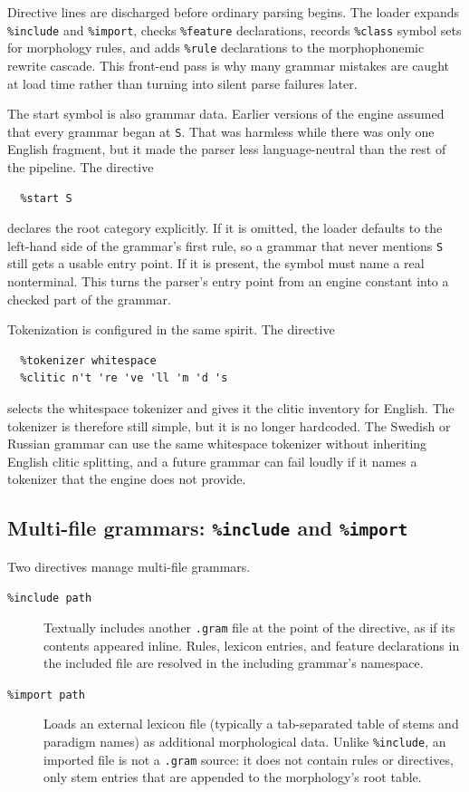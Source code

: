 \documentclass[11pt]{article}
\theoremstyle{definition}
\theoremstyle{plain}
\theoremstyle{remark}
\begin{document}
Directive lines are discharged before ordinary parsing begins. The loader expands
\texttt{\%include} and \texttt{\%import}, checks \texttt{\%feature}
declarations, records \texttt{\%class} symbol sets for morphology rules, and
adds \texttt{\%rule} declarations to the morphophonemic rewrite cascade. This
front-end pass is why many grammar mistakes are caught at load time rather than
turning into silent parse failures later.

The start symbol is also grammar data. Earlier versions of the engine assumed
that every grammar began at \texttt{S}. That was harmless while there was only
one English fragment, but it made the parser less language-neutral than the rest
of the pipeline. The directive

\begin{verbatim}
  %start S
\end{verbatim}

declares the root category explicitly. If it is omitted, the loader defaults to
the left-hand side of the grammar's first rule, so a grammar that never mentions
\texttt{S} still gets a usable entry point. If it is present, the symbol must
name a real nonterminal. This turns the parser's entry point from an engine
constant into a checked part of the grammar.

Tokenization is configured in the same spirit. The directive

\begin{verbatim}
  %tokenizer whitespace
  %clitic n't 're 've 'll 'm 'd 's
\end{verbatim}

selects the whitespace tokenizer and gives it the clitic inventory for English.
The tokenizer is therefore still simple, but it is no longer hardcoded. The Swedish or Russian
grammar can use the same whitespace tokenizer without inheriting English clitic
splitting, and a future grammar can fail loudly if it names a tokenizer that the
engine does not provide.

\subsection{Multi-file grammars: \texttt{\%include} and \texttt{\%import}}

Two directives manage multi-file grammars.

\begin{description}
  \item[\texttt{\%include path}] Textually includes another \texttt{.gram} file at
  the point of the directive, as if its contents appeared inline. Rules, lexicon
  entries, and feature declarations in the included file are resolved in the including
  grammar's namespace.

  \item[\texttt{\%import path}] Loads an external lexicon file (typically a
  tab-separated table of stems and paradigm names) as additional morphological data.
  Unlike \texttt{\%include}, an imported file is not a \texttt{.gram} source: it
  does not contain rules or directives, only stem entries that are appended to the
  morphology's root table.
\end{description}
\end{document}
